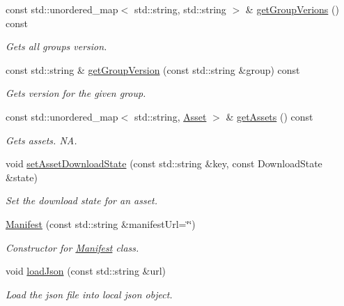 \begin{DoxyCompactItemize}
\mbox{\label{classManifest_a87d4be45cc352992e26916a0e3eae006}} 
const std\+::unordered\+\_\+map$<$ std\+::string, std\+::string $>$ \& \hyperlink{classManifest_a87d4be45cc352992e26916a0e3eae006}{get\+Group\+Verions} () const
\begin{DoxyCompactList}\small\item\em Gets all groups version. \end{DoxyCompactList}\item 
const std\+::string \& \hyperlink{classManifest_a6a2c750cb797d4b81d7ec180096a8817}{get\+Group\+Version} (const std\+::string \&group) const
\begin{DoxyCompactList}\small\item\em Gets version for the given group. \end{DoxyCompactList}\item 
\mbox{\label{classManifest_ae47ed0535126a1268a27d596d90edf0e}} 
const std\+::unordered\+\_\+map$<$ std\+::string, \hyperlink{structManifest_1_1Asset}{Asset} $>$ \& \hyperlink{classManifest_ae47ed0535126a1268a27d596d90edf0e}{get\+Assets} () const
\begin{DoxyCompactList}\small\item\em Gets assets.  NA. \end{DoxyCompactList}\item 
void \hyperlink{classManifest_afd94d5f1d587ec8c82cf47ad8b3ea7bf}{set\+Asset\+Download\+State} (const std\+::string \&key, const Download\+State \&state)
\begin{DoxyCompactList}\small\item\em Set the download state for an asset. \end{DoxyCompactList}\item 
\hyperlink{classManifest_ab824b9e77f3381d19a7f32db41840da7}{Manifest} (const std\+::string \&manifest\+Url=\char`\"{}\char`\"{})
\begin{DoxyCompactList}\small\item\em Constructor for \hyperlink{classManifest}{Manifest} class. \end{DoxyCompactList}\item 
void \hyperlink{classManifest_a47aa1ad3edc161e420109489ce36823f}{load\+Json} (const std\+::string \&url)
\begin{DoxyCompactList}\small\item\em Load the json file into local json object. \end{DoxyCompactList}\item 

\end{DoxyCompactItemize}
